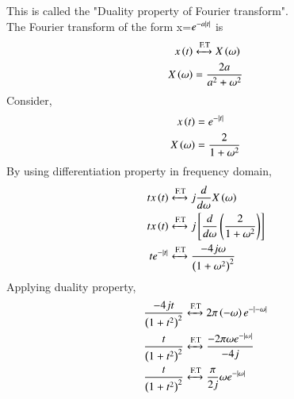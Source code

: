 \documentclass[journal,12pt,twocolumn]{IEEEtran}
\theoremstyle{remark}
\begin{document}
This is called the "Duality property of Fourier transform".\\
The Fourier transform of the form x=$e^{-a\left\vert t\right\vert}$ is 
\begin{align}
    x\left(t\right)&\xleftrightarrow{\text{F.T}} X\left(\omega\right)\\
    X\left(\omega\right)&= \frac{2a}{a^2+\omega^2}
\end{align}
Consider, 
\begin{align}
    x\left(t\right)&=e^{-\left\vert t\right\vert}\\
    X\left(\omega\right)&=\frac{2}{1+\omega^2}
\end{align}
By using differentiation property in frequency domain,
\begin{align}
    tx\left(t\right)&\xleftrightarrow{\text{F.T}}j\frac{d}{d\omega}X\left(\omega\right)\\
     tx\left(t\right)&\xleftrightarrow{\text{F.T}}j{}\left[\frac{d}{d\omega}\left(\frac{2}{1+\omega^2}\right)\right]\\
     te^{-\left\vert t\right\vert}&\xleftrightarrow{\text{F.T}}\frac{-4j\omega}{\left(1+\omega^2\right)^2}
\end{align}
Applying duality property,
\begin{align}
    \frac{-4jt}{\left(1+t^2\right)^2}&\xleftrightarrow{\text{F.T}}2\pi\left(-\omega\right)e^{-\left\vert-\omega\right\vert}\\
    \frac{t}{\left(1+t^2\right)^2}&\xleftrightarrow{\text{F.T}}\frac{-2\pi\omega e^{-\left\vert\omega\right\vert}}{-4j}\\
    \frac{t}{\left(1+t^2\right)^2}&\xleftrightarrow{\text{F.T}}\frac{\pi}{2j}\omega e^{-\left\vert\omega\right\vert}
\end{align}
\end{document}
